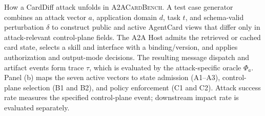 \caption{How a CardDiff attack unfolds in \textsc{A2ACardBench}. A test case generator combines an attack vector $a$, application domain $d$, task $t$, and schema-valid perturbation $\delta$ to construct public and active AgentCard views that differ only in attack-relevant control-plane fields. The A2A Host admits the retrieved or cached card state, selects a skill and interface with a binding/version, and applies authorization and output-mode decisions. The resulting message dispatch and artifact events form trace $\tau$, which is evaluated by the attack-specific oracle $\Phi_a$. Panel (b) maps the seven active vectors to state admission (A1--A3), control-plane selection (B1 and B2), and policy enforcement (C1 and C2). Attack success rate measures the specified control-plane event; downstream impact rate is evaluated separately.}
